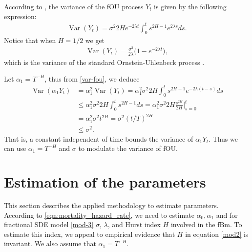 \documentclass[smallextended]{svjour3}
\DeclareMathOperator{\Var}{Var}
\begin{document}
        According to \cite{ze-ch-ya}, the variance of the fOU process $Y_t$ is 
    given by the following expression:
    \begin{align}
        \Var(Y_t)= 
            \sigma^2 2H e^{-2\lambda t} 
            \int_0^t s^{2H-1} e^{2\lambda s} ds.\label{var-fou}
    \end{align}
    Notice that when $H=1/2$ we get
    \begin{align}
        \Var(Y_t)= \frac{\sigma^2}{2\lambda}  \big(1-e^{-2\lambda t}\big),
    \end{align}
    which is the variance of the standard Ornstein-Uhlenbeck process 
   \citep[see][p. 143]{mik}. 

    Let $\alpha_1 = T^{-H}$, thus from \cref{var-fou}, we deduce
    \begin{equation} \label{var-fou1}
        \begin{aligned}
            \Var(\alpha_1 Y_t)
                & = 
                    \alpha_1 ^2 
                    \Var(Y_t)= \alpha_1^2 \sigma ^ 2 2H  
                    \int_0^t
                        s^{2H - 1} 
                        e^{-2 \lambda (t - s)} 
                    ds
                \\
                & \le 
                    \alpha_1 ^ 2 
                    \sigma^2 2H  
                    \int_0^t
                         s^{2H-1} ds
                     = \alpha_1^2 \sigma^2 2H
                    \frac{s^{2H}}{2H}
                    \Big|_{s=0}^t 
                \\
                & = 
                    \alpha_1 ^ 2 
                    \sigma ^ 2 t ^ {2H} 
                    = \sigma ^ 2 (t / T) ^ {2H}
                \\
                & \leq
                \sigma^2 .
        \end{aligned}
    \end{equation}
    That is, a constant independent of time bounds the variance of
    $\alpha_1 Y_t$. Thus we can use $\alpha_1 = T^ {-H}$ and $\sigma$ to 
    modulate the variance of fOU.
%
\section{Estimation of the parameters}
    \label{esti}
        This section describes the applied methodology to estimate parameters.
    According to \eqref{eqn:mortality_hazard_rate}, we need to 
    estimate $\alpha_0, \alpha_1$ and for fractional SDE model \eqref{mod-3}
    $\sigma$, $\lambda$, and Hurst index $H$ involved in the fBm. 
    To estimate this index, we appeal to empirical evidence that $H$ in 
    equation \eqref{mod2} is invariant. We also assume that $\alpha_1=T^{-H}$.
\end{document}

